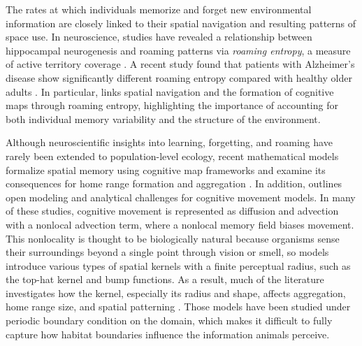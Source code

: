 \documentclass{article}
\begin{document}
The rates at which individuals memorize and forget new environmental information are closely linked to their spatial navigation and resulting patterns of space use. In neuroscience, studies have revealed a relationship between hippocampal neurogenesis and roaming patterns via \textit{roaming entropy}, a measure of active territory coverage \cite{Freund2013,Heller2020}. A recent study found that patients with Alzheimer’s disease show significantly different roaming entropy compared with healthy older adults \cite{Ghosh2022}. In particular, \cite{BRUNEC2023105360} links spatial navigation and the formation of cognitive maps through roaming entropy, highlighting the importance of accounting for both individual memory variability and the structure of the environment.

Although neuroscientific insights into learning, forgetting, and roaming have rarely been extended to population-level ecology, recent mathematical models formalize spatial memory using cognitive map frameworks \cite{Painter2024review,Potts2016Royal,Potts2016,Potts2019} and examine its consequences for home range formation and aggregation \cite{Liu2025,Shi2021,Xue2024}. In addition, \cite{Wang2023} outlines open modeling and analytical challenges for cognitive movement models. In many of these studies, cognitive movement is represented as diffusion and advection with a nonlocal advection term, where a nonlocal memory field biases movement. This nonlocality is thought to be biologically natural because organisms sense their surroundings beyond a single point through vision or smell, so models introduce various types of spatial kernels with a finite perceptual radius, such as the top-hat kernel and bump functions. As a result, much of the literature investigates how the kernel, especially its radius and shape, affects aggregation, home range size, and spatial patterning \cite{Fagan2017,Giunta2024,Liu2025,Painter2024chase}. Those models have been studied under periodic boundary condition on the domain, which makes it difficult to fully capture how habitat boundaries influence the information animals perceive.
\end{document}
